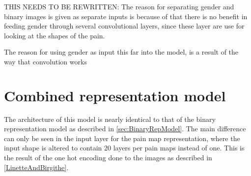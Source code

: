 THIS NEEDS TO BE REWRITTEN: The reason for separating gender and binary images is given as separate inputs is because of that there is no benefit in feeding gender through several convolutional layers, since these layer are use for looking at the shapes of the pain.  

The reason for using gender as input this far into the model, is a result of the way that convolution works 


\section{Combined representation model}\label{sec:CombinedRepModel}
The architecture of this model is nearly identical to that of the binary representation model as described in \ref{sec:BinaryRepModel}. 
The main difference can only be seen in the input layer for the pain map representation, where the input shape is altered to contain 20 layers per pain maps instead of one. 
This is the result of the one hot encoding done to the images as described in \autoref{LinetteAndBirgithe}. 

